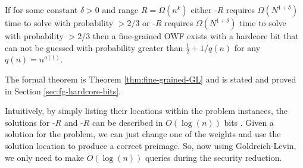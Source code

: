 \begin{theorem}
	If for some constant $\delta>0$ and range $R = \Omega(n^k)$ either \kSum-$R$ requires $\Omega(N^{1+\delta})$ time to solve with probability $>2/3$ or \zkclique-$R$ requires $\Omega(N^{1+\delta})$ time to solve with probability $>2/3$  then a fine-grained OWF exists with a hardcore bit that can not be guessed with probability greater than $\frac 1 2 +1/q(n)$ for any $q(n) = n^{o(1)}$.
\end{theorem}
The formal theorem is Theorem \ref{thm:fine-grained-GL} and is stated and proved in Section \ref{sec:fg-hardcore-bits}.

Intuitively, by simply listing their locations within the problem instances, the solutions for \kSum-$R$ and \zkclique-$R$ can be described in $O(\log(n))$ bits . Given a solution for the problem, we can just change one of the weights and use the solution location to produce a correct preimage. So, now using Goldreich-Levin, we only need to make $O(\log(n))$ queries during the security reduction.






%



